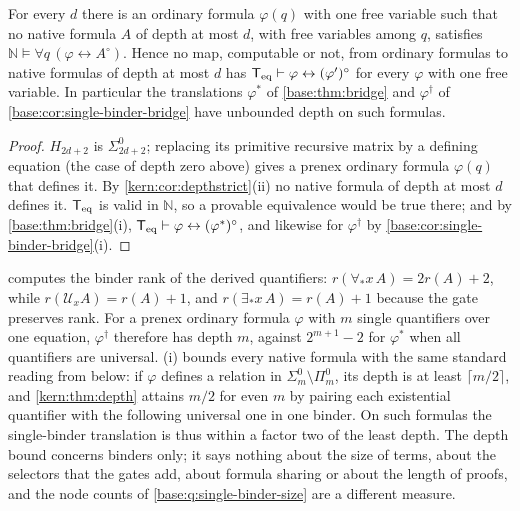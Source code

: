 \begin{corollary}
\label{kern:cor:nofixed}
For every $d$ there is an ordinary formula $\varphi(q)$ with one free
variable such that no native formula $A$ of depth at most $d$, with free
variables among $q$, satisfies $\mathbb N\models\forall q\,
(\varphi\leftrightarrow A^\circ)$.  Hence no map, computable or not, from
ordinary formulas to native formulas of depth at most $d$ has
$\mathsf{T}_{\mathrm{eq}}\vdash\varphi\leftrightarrow(\varphi')^\circ$ for every $\varphi$ with
one free variable.  In particular the translations $\varphi^{*}$ of
\cref{base:thm:bridge} and $\varphi^{\dagger}$ of
\cref{base:cor:single-binder-bridge} have unbounded depth on such formulas.
\end{corollary}

\begin{proof}
$H_{2d+2}$ is $\Sigma^0_{2d+2}$; replacing its primitive recursive matrix by
a defining equation (the case of depth zero above) gives a prenex ordinary
formula $\varphi(q)$ that defines it.  By
\cref{kern:cor:depthstrict}(ii) no native formula of depth at most $d$
defines it.  $\mathsf{T}_{\mathrm{eq}}$ is valid in $\mathbb N$, so a provable equivalence would
be true there; and by \cref{base:thm:bridge}(i),
$\mathsf{T}_{\mathrm{eq}}\vdash\varphi\leftrightarrow(\varphi^{*})^\circ$, and likewise for
$\varphi^{\dagger}$ by \cref{base:cor:single-binder-bridge}(i).
\end{proof}

\begin{remark}
\label{kern:rem:depth-rank}
 computes the binder rank of the derived
quantifiers: $r(\forall_*x\,A)=2r(A)+2$, while
$r(\mathcal U_xA)=r(A)+1$, and $r(\exists_*x\,A)=r(A)+1$ because the gate
preserves rank.  For a prenex ordinary formula $\varphi$ with $m$ single
quantifiers over one equation, $\varphi^{\dagger}$ therefore has depth $m$,
against $2^{m+1}-2$ for $\varphi^{*}$ when all quantifiers are universal.
(i) bounds every native formula with the same
standard reading from below: if $\varphi$ defines a relation in
$\Sigma^0_m\setminus\Pi^0_m$, its depth is at least $\lceil m/2\rceil$, and
\cref{kern:thm:depth} attains $m/2$ for even $m$ by pairing each
existential quantifier with the following universal one in one binder.  On
such formulas the single-binder translation is thus within a factor two of
the least depth.  The depth bound concerns binders only; it says nothing
about the size of terms, about the selectors that the gates add, about
formula sharing or about the length of proofs, and the node counts of
\cref{base:q:single-binder-size} are a different measure.
\end{remark}

